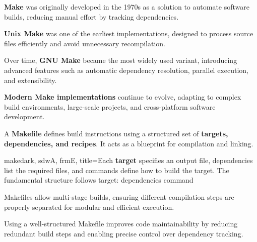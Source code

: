 \begin{NxSSSSBox}
	\begin{NxIDBox}
		\textbf{Make} was originally developed in the 1970s as a solution to automate software builds, reducing manual effort by tracking dependencies.
	\end{NxIDBox}
	\begin{NxIDBox}
		\textbf{Unix Make} was one of the earliest implementations, designed to process source files efficiently and avoid unnecessary recompilation.
	\end{NxIDBox}
	\begin{NxIDBox}
		Over time, \textbf{GNU Make} became the most widely used variant, introducing advanced features such as automatic dependency resolution, parallel execution, and extensibility.
	\end{NxIDBox}
	\begin{NxIDBox}
		\textbf{Modern Make implementations} continue to evolve, adapting to complex build environments, large-scale projects, and cross-platform software development.
	\end{NxIDBox}
\end{NxSSSSBox}

\begin{NxSSSSBox}
	\begin{NxIDBox}
		A \textbf{Makefile} defines build instructions using a structured set of \textbf{targets, dependencies, and recipes}. It acts as a blueprint for compilation and linking.
	\end{NxIDBox}
\end{NxSSSSBox}

\begin{NxCodeBox}{make}{dark, sdwA, frmE, title={Each \textbf{target} specifies an output file, dependencies list the required files, and commands define how to build the target. The fundamental structure follows}}
	target: dependencies
		command
\end{NxCodeBox}

\bigskip

\begin{NxSSSSBox}[breakable]
	\begin{NxIDBox}
		Makefiles allow multi-stage builds, ensuring different compilation steps are properly separated for modular and efficient execution.
	\end{NxIDBox}
	\begin{NxIDBox}
		Using a well-structured Makefile improves code maintainability by reducing redundant build steps and enabling precise control over dependency tracking.
	\end{NxIDBox}
\end{NxSSSSBox}

